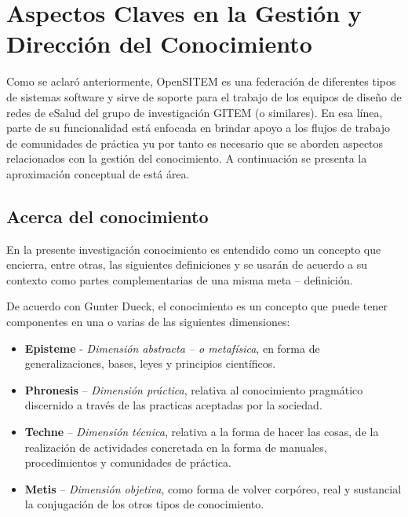 \section{Aspectos Claves en la Gestión y Dirección del Conocimiento}

Como se aclaró anteriormente, OpenSITEM es una federación de diferentes tipos de sistemas software y sirve de soporte para el trabajo de los equipos de diseño de redes de eSalud del grupo de investigación GITEM (o similares). En esa línea, parte de su funcionalidad está enfocada en brindar apoyo a los flujos de trabajo de comunidades de práctica yu por tanto es necesario que se aborden aspectos relacionados con la gestión del conocimiento. A continuación se presenta la aproximación conceptual de está área.

\subsection{Acerca del conocimiento}

En la presente investigación conocimiento es entendido como un concepto que encierra, entre otras, las siguientes definiciones y se usarán de acuerdo a su contexto como partes complementarias de una misma meta – definición.

De acuerdo con Gunter Dueck\cite{dueck2001}, el conocimiento es un concepto que puede tener componentes en una o varias de las siguientes dimensiones:

\begin{itemize}
\item  \textbf{Episteme} -\textit{ Dimensión abstracta – o metafísica}, en forma de generalizaciones, bases, leyes y principios científicos.

\item \textbf{Phronesis }– \textit{Dimensión práctica}, relativa al conocimiento pragmático discernido a través de las practicas aceptadas por la sociedad.

\item \textbf{Techne} – \textit{Dimensión técnica}, relativa a la forma de hacer las cosas, de la realización de actividades concretada en la forma de manuales, procedimientos y comunidades de práctica.

\item \textbf{Metis} – \textit{Dimensión objetiva}, como forma de volver corpóreo, real y sustancial la conjugación de los otros tipos de conocimiento.
\end{itemize}

